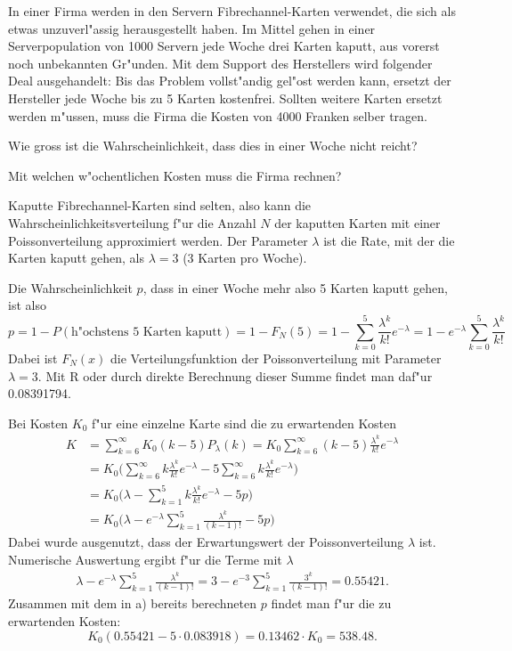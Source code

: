 In einer Firma werden in den Servern Fibrechannel-Karten verwendet,
die sich als etwas unzuverl"assig herausgestellt haben.
Im Mittel gehen in einer Serverpopulation von 1000 Servern jede Woche
drei Karten kaputt, aus vorerst noch unbekannten Gr"unden.
Mit dem Support des Herstellers wird folgender Deal
ausgehandelt: Bis das Problem vollst"andig gel"ost werden kann, 
ersetzt der Hersteller jede Woche bis zu 5 Karten kostenfrei.
Sollten weitere Karten ersetzt werden m"ussen, muss die Firma
die Kosten von 4000 Franken selber tragen.
\begin{teilaufgaben}
\item
Wie gross ist die Wahrscheinlichkeit, dass dies in einer Woche nicht
reicht?
\item
Mit welchen w"ochentlichen Kosten muss die Firma rechnen?
\end{teilaufgaben}

\begin{loesung}
Kaputte Fibrechannel-Karten sind selten, also kann
die Wahrscheinlichkeitsverteilung f"ur die Anzahl $N$ der kaputten Karten
mit einer Poissonverteilung approximiert werden. Der Parameter $\lambda$
ist die Rate, mit der die Karten kaputt gehen, als $\lambda=3$ (3 Karten
pro Woche).
\begin{teilaufgaben}
\item
Die Wahrscheinlichkeit $p$, dass in einer Woche mehr also 5 Karten kaputt
gehen, ist also
\[
p=1-P(\text{h"ochstens 5 Karten kaputt})=1-F_N(5)
=1-\sum_{k=0}^5\frac{\lambda^k}{k!}e^{-\lambda}
=1-e^{-\lambda}\sum_{k=0}^5\frac{\lambda^k}{k!}
\]
Dabei ist $F_N(x)$ die Verteilungsfunktion der Poissonverteilung mit
Parameter $\lambda=3$. Mit R oder durch direkte Berechnung dieser
Summe findet man daf"ur 0.08391794.
\item
Bei Kosten $K_0$ f"ur eine einzelne Karte sind die zu erwartenden Kosten 
\begin{align*}
K
&=
\sum_{k=6}^\infty K_0(k-5)P_\lambda(k)
=
K_0
\sum_{k=6}^\infty (k-5)\frac{\lambda^k}{k!}e^{-\lambda}
\\
&=
K_0\biggl(
\sum_{k=6}^\infty k\frac{\lambda^k}{k!}e^{-\lambda}
-5\sum_{k=6}^\infty k\frac{\lambda^k}{k!}e^{-\lambda}
\biggr)
\\
&=
K_0\biggl(
\lambda-\sum_{k=1}^5k\frac{\lambda^k}{k!}e^{-\lambda}
-5p
\biggr)
\\
&=
K_0\biggl(\lambda- e^{-\lambda}\sum_{k=1}^5\frac{\lambda^k}{(k-1)!} -5p\biggr)
\end{align*}
Dabei wurde ausgenutzt, dass der Erwartungswert der Poissonverteilung
$\lambda$ ist.
Numerische Auswertung ergibt f"ur die Terme mit $\lambda$
\begin{align*}
\lambda-e^{-\lambda}\sum_{k=1}^5\frac{\lambda^k}{(k-1)!}
=
3-e^{-3}\sum_{k=1}^5\frac{3^k}{(k-1)!}
=0.55421.
\end{align*}
Zusammen mit dem in a) bereits berechneten $p$ findet man f"ur die
zu erwartenden Kosten:
\[
K_0(0.55421 - 5\cdot 0.083918)=0.13462\cdot K_0 = 538.48.
\]
\end{teilaufgaben}
\end{loesung}
